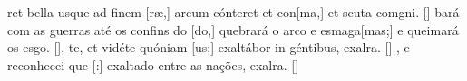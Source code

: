 {  %
  {ret bella usque ad finem [ræ,] arcum cónteret et con[ma,] et scuta comgni. [\LinkLA]}%
    {bará com as guerras até os confins do [do,] quebrará o arco e esmaga[mas;] e queimará os esgo. [\LinkPT]},
  {te, et vidéte quóniam [us;] exaltábor in géntibus, exalra. [\LinkLA]}%
    {, e reconhecei que [:] exaltado entre as nações, exalra. [\LinkLA]}
}